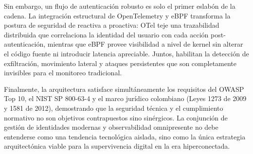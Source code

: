 \documentclass[12pt, a4paper]{article}
\begin{document}
Sin embargo, un flujo de autenticación robusto es solo el primer eslabón de la
cadena. La integración estructural de OpenTelemetry y eBPF transforma la postura
de seguridad de reactiva a proactiva: OTel teje una trazabilidad distribuida que
correlaciona la identidad del usuario con cada acción post-autenticación, mientras
que eBPF provee visibilidad a nivel de kernel sin alterar el código fuente ni
introducir latencia apreciable. Juntos, habilitan la detección de exfiltración,
movimiento lateral y ataques persistentes que son completamente invisibles para
el monitoreo tradicional.

Finalmente, la arquitectura satisface simultáneamente los requisitos del OWASP
Top 10, el NIST SP 800-63-4 y el marco jurídico colombiano (Leyes 1273 de 2009
y 1581 de 2012), demostrando que la seguridad técnica y el cumplimiento normativo
no son objetivos contrapuestos sino sinérgicos. La conjunción de gestión de
identidades modernas y observabilidad omnipresente no debe entenderse como una
tendencia tecnológica aislada, sino como la única estrategia arquitectónica
viable para la supervivencia digital en la era hiperconectada.
\end{document}
